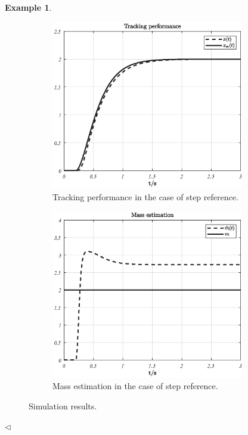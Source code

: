 \documentclass[11pt,a4paper,oneside]{book}
\numberwithin{equation}{section}
\theoremstyle{it}
\theoremstyle{definition}
\newtheorem{example}{Example}[chapter]
\begin{document}
\begin{example}
	\begin{figure}[H]
		\centering
		\begin{subfigure}{.5\textwidth}
			\centering
			\includegraphics[width = 240pt, keepaspectratio]{figures/adaptive_control/step_track.eps}
			\captionsetup{width=0.5\textwidth, font=small}		
			\caption{Tracking performance in the case of step reference.}
			\label{figSim3}
		\end{subfigure}%
		\begin{subfigure}{.5\textwidth}
			\centering
			\includegraphics[width = 240pt, keepaspectratio]{figures/adaptive_control/step_mass_est.eps}
			\captionsetup{width=0.5\textwidth, font=small}		
			\caption{Mass estimation in the case of step reference.}
			\label{figSim4}
		\end{subfigure}
		\caption{Simulation results.}
		\label{}
	\end{figure}
	$\triangleleft$
\end{example}
\end{document}

